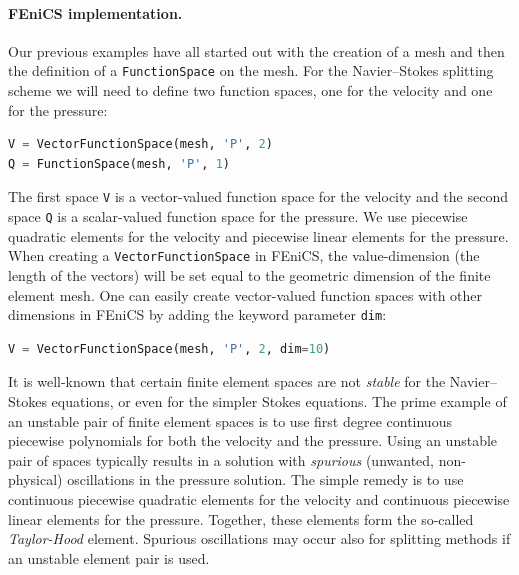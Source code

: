 \documentclass[graybox,envcountchap,sectrefs,final]{svmonodo}
\newenvironment{notice_mdfboxadmon}[1][]{
\begin{notice_mdfboxmdframed}[frametitle=#1]
}
{
\end{notice_mdfboxmdframed}
}
\begin{document}
\paragraph{FEniCS implementation.}
Our previous examples have all started out with the creation of a mesh
and then the definition of a \texttt{FunctionSpace} on the mesh. For the
Navier--Stokes splitting scheme we will need to define two function
spaces, one for the velocity and one for the pressure:

\begin{lstlisting}[language=Python,style=graycolor]
V = VectorFunctionSpace(mesh, 'P', 2)
Q = FunctionSpace(mesh, 'P', 1)
\end{lstlisting}
The first space \texttt{V} is a vector-valued function space for the velocity
and the second space \texttt{Q} is a scalar-valued function space for the
pressure. We use piecewise quadratic elements for the velocity and
piecewise linear elements for the pressure. When creating a
\texttt{VectorFunctionSpace} in FEniCS, the value-dimension (the length of
the vectors) will be set equal to the geometric dimension of the
finite element mesh. One can easily create vector-valued function
spaces with other dimensions in FEniCS by adding the keyword parameter
\texttt{dim}:


\begin{lstlisting}[language=Python,style=graycolor]
V = VectorFunctionSpace(mesh, 'P', 2, dim=10)
\end{lstlisting}


\begin{notice_mdfboxadmon}
It is well-known that certain finite element spaces are not \emph{stable}
for the Navier--Stokes equations, or even for the simpler Stokes
equations. The prime example of an unstable pair of finite element
spaces is to use first degree continuous piecewise polynomials for both the
velocity and the pressure. Using an
unstable pair of spaces typically results in a solution with
\emph{spurious} (unwanted, non-physical) oscillations in the pressure
solution. The simple remedy is to use continuous piecewise
quadratic elements for the velocity and continuous piecewise linear
elements for the pressure. Together, these elements form the so-called
\emph{Taylor-Hood} element. Spurious oscillations may occur also for
splitting methods if an unstable element pair is used.
\end{notice_mdfboxadmon} %
\end{document}
